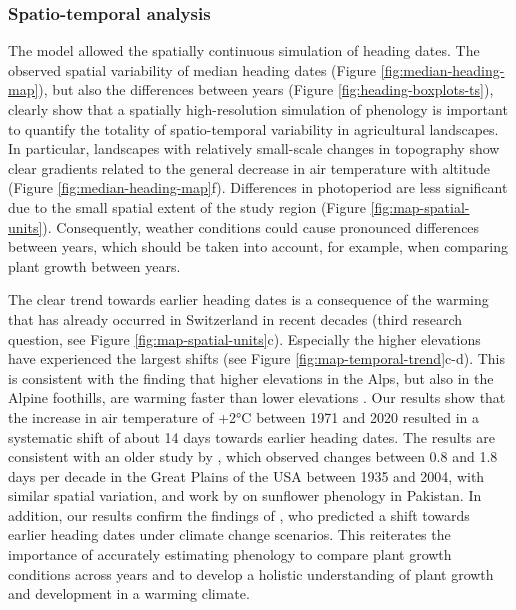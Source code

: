 \subsubsection{Spatio-temporal analysis}
The model allowed the spatially continuous simulation of heading dates. The observed spatial variability of median heading dates (Figure \ref{fig:median-heading-map}), but also the differences between years (Figure \ref{fig:heading-boxplots-ts}), clearly show that a spatially high-resolution simulation of phenology is important to quantify the totality of spatio-temporal variability in agricultural landscapes. In particular, landscapes with relatively small-scale changes in topography show clear gradients related to the general decrease in air temperature with altitude (Figure \ref{fig:median-heading-map}f). Differences in photoperiod are less significant due to the small spatial extent of the study region (Figure \ref{fig:map-spatial-units}). Consequently, weather conditions could cause pronounced differences between years, which should be taken into account, for example, when comparing plant growth between years.

The clear trend towards earlier heading dates is a consequence of the warming that has already occurred in Switzerland in recent decades (third research question, see Figure \ref{fig:map-spatial-units}c). Especially the higher elevations have experienced the largest shifts (see Figure \ref{fig:map-temporal-trend}c-d). This is consistent with the finding that higher elevations in the Alps, but also in the Alpine foothills, are warming faster than lower elevations \citep{gusewell_changes_2017}. Our results show that the increase in air temperature of +2°C between 1971 and 2020 resulted in a systematic shift of about 14 days towards earlier heading dates. The results are consistent with an older study by \cite{hu_earlier_2005}, which observed changes between 0.8 and 1.8 days per decade in the Great Plains of the USA between 1935 and 2004, with similar spatial variation, and work by \cite{tariq_impact_2018} on sunflower phenology in Pakistan. In addition, our results confirm the findings of \cite{rogger_can_2021}, who predicted a shift towards earlier heading dates under climate change scenarios. This reiterates the importance of accurately estimating phenology to compare plant growth conditions across years and to develop a holistic understanding of plant growth and development in a warming climate.

